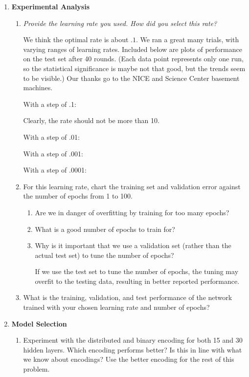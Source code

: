 \documentclass{article}
\begin{document}
\begin{enumerate}
  \item \textbf{Experimental Analysis}
    \begin{enumerate}
    \item \textit{Provide the learning rate you used. How did you
      select this rate?}

      We think the optimal rate is about $.1$. We ran a great many
      trials, with varying ranges of learning rates. Included below
      are plots of performance on the test set after 40 rounds. (Each
      data point represents only one run, so the statistical
      significance is maybe not that good, but the trends seem to be
      visible.) Our thanks go to the NICE and Science Center basement
      machines.


      With a step of .1:

      Clearly, the rate should not be more than 10.

      With a step of .01:

      With a step of .001:

      With a step of .0001:


    \item For this learning rate, chart the training set and validation error
      against the number of epochs from 1 to 100. 

      \begin{enumerate}
      \item Are we in danger of overfitting by training for too many epochs?


      \item What is a good number of epochs to train for?


      \item Why is it important that we use a validation set (rather than the
        actual test set) to tune the number of epochs?

        If we use the test set to tune the number of epochs, the tuning may 
        overfit to the testing data, resulting in better reported performance. 

      \end{enumerate}
    \item What is the training, validation, and test performance of the
      network trained with your chosen learning rate and number of epochs?

    \end{enumerate}

  \item \textbf{Model Selection}
    \begin{enumerate}
    \item Experiment with the distributed and binary encoding for both 15 and
      30 hidden layers. Which encoding performs better? Is this in line with what
      we know about encodings? Use the better encoding for the rest of this problem.


\end{enumerate}
\end{enumerate}
\end{document}
